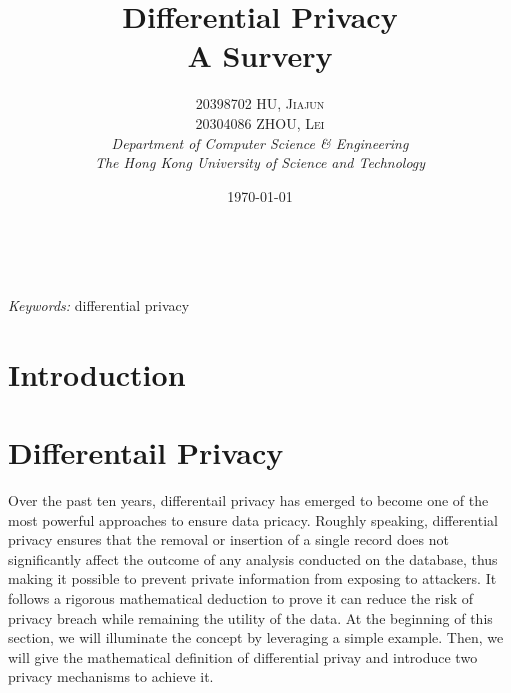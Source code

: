 \documentclass[a4paper, 11pt]{article} %
\title{\textbf{Differential Privacy}\\ %
A Survery} %
\author{\textsc{20398702 HU, Jiajun \\ 20304086 ZHOU, Lei} %
\\{\textit{Department of Computer Science \& Engineering \\ The Hong Kong University of Science and Technology}}} %
\date{\today} %
\makeatletter
\theoremstyle{definition}
\renewcommand{\maketitle}{ %
\begin{flushright} %
{\LARGE\@title} %

\vspace{50pt} %

{\large\@author} %
\\\@date %

\vspace{40pt} %
\end{flushright}
}
\makeatother
\begin{document}
\maketitle %



\begin{abstract}

\end{abstract}

\hspace*{3,6mm}\textit{Keywords:} differential privacy %

\vspace{30pt} %


\section{Introduction}








\section{Differentail Privacy}

Over the past ten years, differentail privacy\cite{dwork2008differential, dwork2014algorithmic} has emerged to become one of the most powerful approaches to ensure data pricacy. Roughly speaking, differential privacy ensures that the removal or insertion of a single record does not significantly affect the outcome of any analysis conducted on the database, thus making it possible to prevent private information from exposing to attackers. It follows a rigorous mathematical deduction to prove it can reduce the risk of privacy breach while remaining the utility of the data. At the beginning of this section, we will illuminate the concept by leveraging a simple example. Then, we will give the mathematical definition of differential privay and introduce two privacy mechanisms to achieve it.
\end{document}
